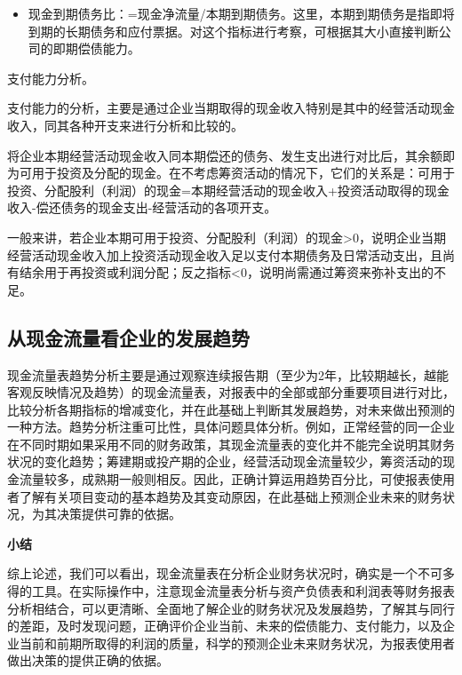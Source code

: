 \begin{enumerate.zh}
\begin{itemize}
            \item  现金到期债务比：=现金净流量/本期到期债务。这里，本期到期债务是指即将到期的长期债务和应付票据。对这个指标进行考察，可根据其大小直接判断公司的即期偿债能力。
        \end{itemize}

    \item  支付能力分析。

    支付能力的分析，主要是通过企业当期取得的现金收入特别是其中的经营活动现金收入，同其各种开支来进行分析和比较的。

    将企业本期经营活动现金收入同本期偿还的债务、发生支出进行对比后，其余额即为可用于投资及分配的现金。在不考虑筹资活动的情况下，它们的关系是：可用于投资、分配股利（利润）的现金=本期经营活动的现金收入+投资活动取得的现金收入-偿还债务的现金支出-经营活动的各项开支。

    一般来讲，若企业本期可用于投资、分配股利（利润）的现金>0，说明企业当期经营活动现金收入加上投资活动现金收入足以支付本期债务及日常活动支出，且尚有结余用于再投资或利润分配；反之指标<0，说明尚需通过筹资来弥补支出的不足。

    \end{enumerate.zh}

\subsection {从现金流量看企业的发展趋势}

    现金流量表趋势分析主要是通过观察连续报告期（至少为2年，比较期越长，越能客观反映情况及趋势）的现金流量表，对报表中的全部或部分重要项目进行对比，比较分析各期指标的增减变化，并在此基础上判断其发展趋势，对未来做出预测的一种方法。趋势分析注重可比性，具体问题具体分析。例如，正常经营的同一企业在不同时期如果采用不同的财务政策，其现金流量表的变化并不能完全说明其财务状况的变化趋势；筹建期或投产期的企业，经营活动现金流量较少，筹资活动的现金流量较多，成熟期一般则相反。因此，正确计算运用趋势百分比，可使报表使用者了解有关项目变动的基本趋势及其变动原因，在此基础上预测企业未来的财务状况，为其决策提供可靠的依据。

\textbf {小结}

    综上论述，我们可以看出，现金流量表在分析企业财务状况时，确实是一个不可多得的工具。在实际操作中，注意现金流量表分析与资产负债表和利润表等财务报表分析相结合，可以更清晰、全面地了解企业的财务状况及发展趋势，了解其与同行的差距，及时发现问题，正确评价企业当前、未来的偿债能力、支付能力，以及企业当前和前期所取得的利润的质量，科学的预测企业未来财务状况，为报表使用者做出决策的提供正确的依据。

